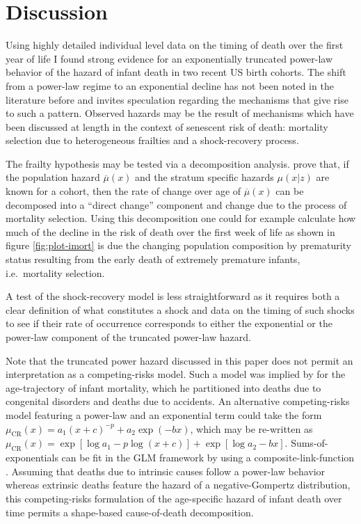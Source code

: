 \documentclass[smallextended]{svjour3} %
\begin{document}
\section*{Discussion}\label{discussion}

Using highly detailed individual level data on the timing of death over
the first year of life I found strong evidence for an exponentially
truncated power-law behavior of the hazard of infant death in two recent
US birth cohorts. The shift from a power-law regime to an exponential
decline has not been noted in the literature before and invites
speculation regarding the mechanisms that give rise to such a pattern.
Observed hazards may be the result of mechanisms which have been
discussed at length in the context of senescent risk of death: mortality
selection due to heterogeneous frailties and a shock-recovery process.

The frailty hypothesis may be tested via a decomposition analysis.
\citet{Vaupel2010a} prove that, if the population hazard
\(\overline\mu(x)\) and the stratum specific hazards \(\mu(x|z)\) are
known for a cohort, then the rate of change over age of
\(\overline\mu(x)\) can be decomposed into a ``direct change'' component
and change due to the process of mortality selection. Using this
decomposition one could for example calculate how much of the decline in
the risk of death over the first week of life as shown in figure
\ref{fig:plot-imort} is due the changing population composition by
prematurity status resulting from the early death of extremely premature
infants, i.e.~mortality selection.

A test of the shock-recovery model is less straightforward as it
requires both a clear definition of what constitutes a shock and data on
the timing of such shocks to see if their rate of occurrence corresponds
to either the exponential or the power-law component of the truncated
power-law hazard.

Note that the truncated power hazard discussed in this paper does not
permit an interpretation as a competing-risks model. Such a model was
implied by \citet{Bourgeois-Pichat1951} for the age-trajectory of infant
mortality, which he partitioned into deaths due to congenital disorders
and deaths due to accidents. An alternative competing-risks model
featuring a power-law and an exponential term could take the form
\(\mu_\text{CR}(x)=a_1(x+c)^{-p} + a_2\exp(-bx)\), which may be
re-written as
\(\mu_\text{CR}(x)=\exp[\log a_1 - p\log(x+c)] + \exp[\log a_2 - bx]\).
Sums-of-exponentials can be fit in the GLM framework by using a
composite-link-function \citep{Thompson1981, Camarda2016}. Assuming that
deaths due to intrinsic causes follow a power-law behavior whereas
extrinsic deaths feature the hazard of a negative-Gompertz distribution,
this competing-risks formulation of the age-specific hazard of infant
death over time permits a shape-based cause-of-death decomposition.
\end{document}

